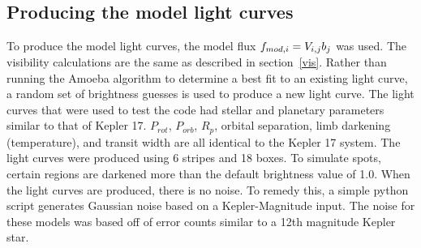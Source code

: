 

\subsection{Producing the model light curves \label{modelLC}}
To produce the model light curves, the model flux $\mbox{$f_{mod,i}$} = V_{i,j} b_j$ was used. The visibility calculations are the same as described in section~\ref{vis}. Rather than running the Amoeba algorithm to determine a best fit to an existing light curve, a random set of brightness guesses is used to produce a new light curve. The light curves that were used to test the code had stellar and planetary parameters similar to that of Kepler 17. $P_{rot}$, $P_{orb}$, $R_p$, orbital separation, limb darkening (temperature), and transit width are all identical to the Kepler 17 system. The light curves were produced using 6 stripes and 18 boxes. To simulate spots, certain regions are darkened more than the default brightness value of 1.0. When the light curves are produced, there is no noise. To remedy this, a simple python script generates Gaussian noise based on a Kepler-Magnitude input. The noise for these models was based off of error counts similar to a 12th magnitude Kepler star.

